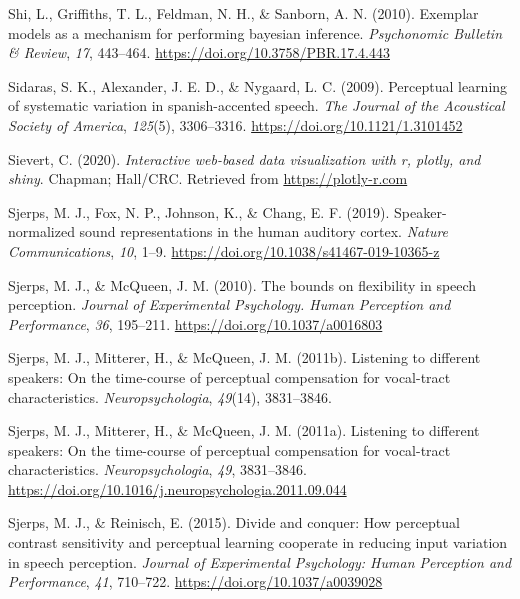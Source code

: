 \documentclass[
  11pt,
  english,
  man,floatsintext]{apa6}
\newlength{\cslhangindent}
\newlength{\cslentryspacingunit} %
\newenvironment{CSLReferences}[2] %
 {%
  \setlength{\parindent}{0pt}
  \ifodd #1
  \let\oldpar\par
  \def\par{\hangindent=\cslhangindent\oldpar}
  \fi
  \setlength{\parskip}{#2\cslentryspacingunit}
 }%
 {}
\begin{document}
\begin{CSLReferences}{1}{0}
\leavevmode{}%
Shi, L., Griffiths, T. L., Feldman, N. H., \& Sanborn, A. N. (2010). Exemplar models as a mechanism for performing bayesian inference. \emph{Psychonomic Bulletin \& Review}, \emph{17}, 443--464. \url{https://doi.org/10.3758/PBR.17.4.443}

\leavevmode{}%
Sidaras, S. K., Alexander, J. E. D., \& Nygaard, L. C. (2009). Perceptual learning of systematic variation in spanish-accented speech. \emph{The Journal of the Acoustical Society of America}, \emph{125}(5), 3306--3316. \url{https://doi.org/10.1121/1.3101452}

\leavevmode{}%
Sievert, C. (2020). \emph{Interactive web-based data visualization with r, plotly, and shiny}. Chapman; Hall/CRC. Retrieved from \url{https://plotly-r.com}

\leavevmode{}%
Sjerps, M. J., Fox, N. P., Johnson, K., \& Chang, E. F. (2019). Speaker-normalized sound representations in the human auditory cortex. \emph{Nature Communications}, \emph{10}, 1--9. \url{https://doi.org/10.1038/s41467-019-10365-z}

\leavevmode{}%
Sjerps, M. J., \& McQueen, J. M. (2010). The bounds on flexibility in speech perception. \emph{Journal of Experimental Psychology. Human Perception and Performance}, \emph{36}, 195--211. \url{https://doi.org/10.1037/a0016803}

\leavevmode{}%
Sjerps, M. J., Mitterer, H., \& McQueen, J. M. (2011b). Listening to different speakers: On the time-course of perceptual compensation for vocal-tract characteristics. \emph{Neuropsychologia}, \emph{49}(14), 3831--3846.

\leavevmode{}%
Sjerps, M. J., Mitterer, H., \& McQueen, J. M. (2011a). Listening to different speakers: On the time-course of perceptual compensation for vocal-tract characteristics. \emph{Neuropsychologia}, \emph{49}, 3831--3846. \url{https://doi.org/10.1016/j.neuropsychologia.2011.09.044}

\leavevmode{}%
Sjerps, M. J., \& Reinisch, E. (2015). Divide and conquer: How perceptual contrast sensitivity and perceptual learning cooperate in reducing input variation in speech perception. \emph{Journal of Experimental Psychology: Human Perception and Performance}, \emph{41}, 710--722. \url{https://doi.org/10.1037/a0039028}


\end{CSLReferences}
\end{document}
